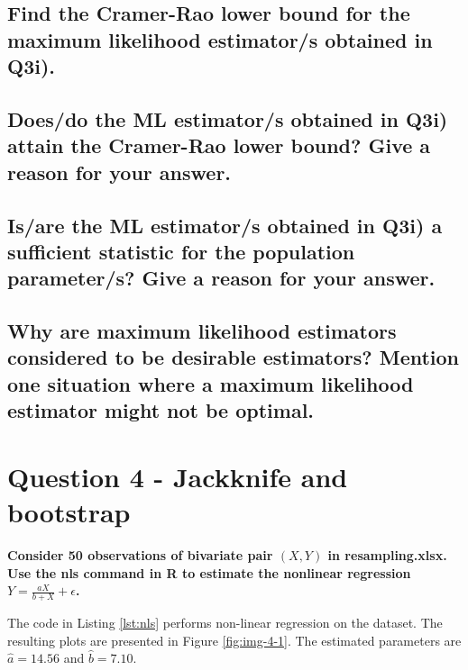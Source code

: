 \documentclass[]{article}
\begin{document}
\subsection{Find the Cramer-Rao lower bound for the maximum likelihood estimator/s obtained in Q3i).}

\subsection{Does/do the ML estimator/s obtained in Q3i) attain the Cramer-Rao lower bound?  Give a reason for your answer. }

\subsection{Is/are the ML estimator/s obtained in Q3i) a sufficient statistic for the population parameter/s?  Give a reason for your answer.}

\subsection{Why are maximum likelihood estimators considered to be desirable estimators?  Mention one situation where a maximum likelihood estimator might not be optimal.   }


\section{Question 4 - Jackknife and bootstrap}

\textbf{Consider 50 observations of bivariate pair $(X,Y)$ in resampling.xlsx. Use the nls command in R to estimate the nonlinear regression $Y=\frac{aX}{b+X} + \epsilon$.}

\bigskip

The code in Listing \ref{lst:nls} performs non-linear regression on the dataset. The resulting plots are presented in Figure \ref{fig:img-4-1}. The estimated parameters are $\hat{a} = 14.56$ and $\hat{b} = 7.10$.
\end{document}
